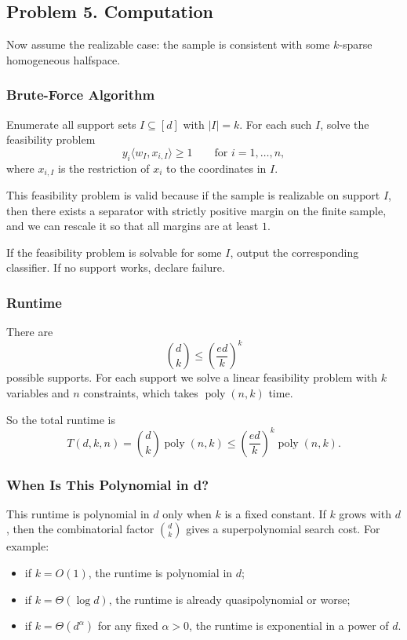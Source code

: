 \documentclass{article}
\begin{document}
\subsection{Problem 5. Computation}

Now assume the realizable case: the sample is consistent with some $k$-sparse homogeneous halfspace.

\subsubsection{Brute-Force Algorithm}

Enumerate all support sets $I\subseteq [d]$ with $|I|=k$. For each such $I$, solve the feasibility problem
$$
y_i \langle w_I, x_{i,I}\rangle \ge 1
\qquad
\text{for } i=1,\dots,n,
$$
where $x_{i,I}$ is the restriction of $x_i$ to the coordinates in $I$.

This feasibility problem is valid because if the sample is realizable on support $I$, then there exists a separator with strictly positive margin on the finite sample, and we can rescale it so that all margins are at least $1$.

If the feasibility problem is solvable for some $I$, output the corresponding classifier. If no support works, declare failure.

\subsubsection{Runtime}

There are
$$
\binom{d}{k}
\le
\left(\frac{ed}{k}\right)^k
$$
possible supports. For each support we solve a linear feasibility problem with $k$ variables and $n$ constraints, which takes $\operatorname{poly}(n,k)$ time.

So the total runtime is
$$
T(d,k,n)
=
\binom{d}{k}\operatorname{poly}(n,k)
\le
\left(\frac{ed}{k}\right)^k \operatorname{poly}(n,k).
$$

\subsubsection{When Is This Polynomial in d?}

This runtime is polynomial in $d$ only when $k$ is a fixed constant. If $k$ grows with $d$, then the combinatorial factor $\binom{d}{k}$ gives a superpolynomial search cost. For example:
\begin{itemize}
\item if $k=O(1)$, the runtime is polynomial in $d$;
\item if $k=\Theta(\log d)$, the runtime is already quasipolynomial or worse;
\item if $k=\Theta(d^\alpha)$ for any fixed $\alpha>0$, the runtime is exponential in a power of $d$.
\end{itemize}
\end{document}
